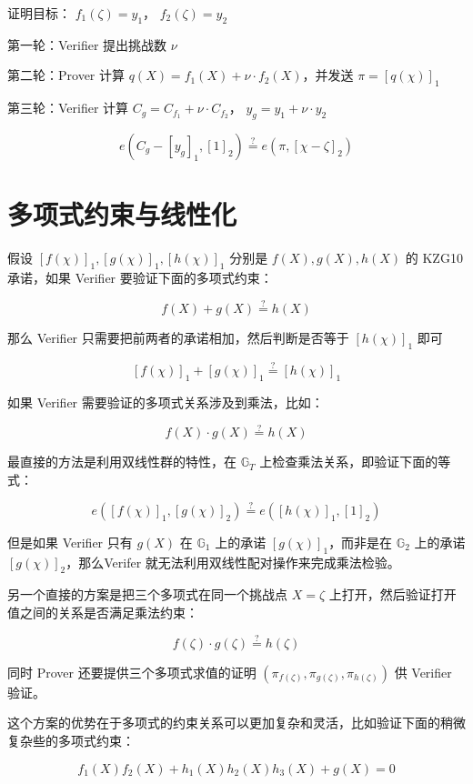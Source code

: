 证明目标： \(f_1(\zeta)=y_1\)， \(f_2(\zeta)=y_2\)

第一轮：Verifier 提出挑战数 \(\nu\)

第二轮：Prover 计算 \(q(X)=f_1(X)+\nu\cdot f_2(X)\)，并发送
\(\pi=[q(\chi)]_1\)

第三轮：Verifier 计算 \(C_g=C_{f_1} + \nu\cdot C_{f_2}\)，
\(y_g = y_1 + \nu\cdot y_2\)

\[
e(C_g - [y_g]_1, [1]_2)\overset{?}{=}e(\pi, [\chi-\zeta]_2)
\]

\hypertarget{ux591aux9879ux5f0fux7ea6ux675fux4e0eux7ebfux6027ux5316}{%
\section{多项式约束与线性化}\label{ux591aux9879ux5f0fux7ea6ux675fux4e0eux7ebfux6027ux5316}}

假设 \([f(\chi)]_1, [g(\chi)]_1, [h(\chi)]_1\) 分别是 \(f(X),g(X),h(X)\)
的 KZG10 承诺，如果 Verifier 要验证下面的多项式约束：

\[
f(X) + g(X) \overset{?}{=} h(X)
\]

那么 Verifier 只需要把前两者的承诺相加，然后判断是否等于 \([h(\chi)]_1\)
即可

\[
[f(\chi)]_1 + [g(\chi)]_1 \overset{?}{=} [h(\chi)]_1
\]

如果 Verifier 需要验证的多项式关系涉及到乘法，比如：

\[
f(X) \cdot g(X) \overset{?}{=} h(X)
\]

最直接的方法是利用双线性群的特性，在 \(\mathbb{G}_T\)
上检查乘法关系，即验证下面的等式：

\[
e([f(\chi)]_1, [g(\chi)]_2) \overset{?}{=} e([h(\chi)]_1, [1]_2)
\]

但是如果 Verifier 只有 \(g(X)\) 在 \(\mathbb{G}_1\) 上的承诺
\([g(\chi)]_1\)，而非是在 \(\mathbb{G}_2\) 上的承诺
\([g(\chi)]_2\)，那么Verifer 就无法利用双线性配对操作来完成乘法检验。

另一个直接的方案是把三个多项式在同一个挑战点 \(X=\zeta\)
上打开，然后验证打开值之间的关系是否满足乘法约束：

\[
f(\zeta)\cdot g(\zeta)\overset{?}{=} h(\zeta)
\]

同时 Prover 还要提供三个多项式求值的证明
\((\pi_{f(\zeta)},\pi_{g(\zeta)},\pi_{h(\zeta)})\) 供 Verifier 验证。

这个方案的优势在于多项式的约束关系可以更加复杂和灵活，比如验证下面的稍微复杂些的多项式约束：

\[
f_1(X)f_2(X) + h_1(X)h_2(X)h_3(X) + g(X) = 0
\]

